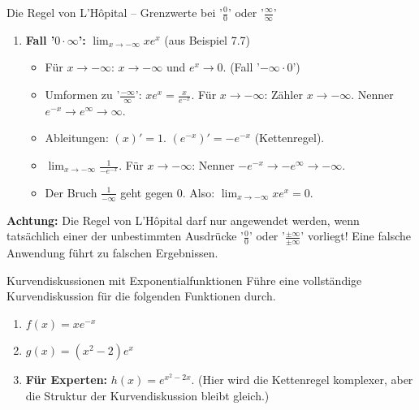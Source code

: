 \begin{infoboxumgebung}{Die Regel von L'Hôpital – Grenzwerte bei '$\frac{0}{0}$' oder '$\frac{\infty}{\infty}$'}
\begin{enumerate}
    \item \textbf{Fall '$0 \cdot \infty$':} $\lim_{x \to -\infty} x e^x$ (aus Beispiel 7.7)
        \begin{itemize}
            \item Für $x \to -\infty$: $x \to -\infty$ und $e^x \to 0$. (Fall '$-\infty \cdot 0$')
            \item Umformen zu '$\frac{-\infty}{\infty}$': $x e^x = \frac{x}{e^{-x}}$. Für $x \to -\infty$: Zähler $x \to -\infty$. Nenner $e^{-x} \to e^{\infty} \to \infty$.
            \item Ableitungen: $(x)' = 1$. $(e^{-x})' = -e^{-x}$ (Kettenregel).
            \item $\lim_{x \to -\infty} \frac{1}{-e^{-x}}$. Für $x \to -\infty$: Nenner $-e^{-x} \to -e^{\infty} \to -\infty$.
            \item Der Bruch $\frac{1}{-\infty}$ geht gegen $0$. Also: $\lim_{x \to -\infty} x e^x = 0$.
        \end{itemize}
\end{enumerate}
\textbf{Achtung:} Die Regel von L'Hôpital darf nur angewendet werden, wenn tatsächlich einer der unbestimmten Ausdrücke '$\frac{0}{0}$' oder '$\frac{\pm\infty}{\pm\infty}$' vorliegt! Eine falsche Anwendung führt zu falschen Ergebnissen.
\end{infoboxumgebung}


\begin{aufgabenumgebung}{Kurvendiskussionen mit Exponentialfunktionen}
Führe eine vollständige Kurvendiskussion für die folgenden Funktionen durch.
\begin{enumerate}
    \item $f(x) = x e^{-x}$
    \item $g(x) = (x^2-2)e^x$
    \item \textbf{Für Experten:} $h(x) = e^{x^2-2x}$. (Hier wird die Kettenregel komplexer, aber die Struktur der Kurvendiskussion bleibt gleich.)
\end{enumerate}
\end{aufgabenumgebung}

